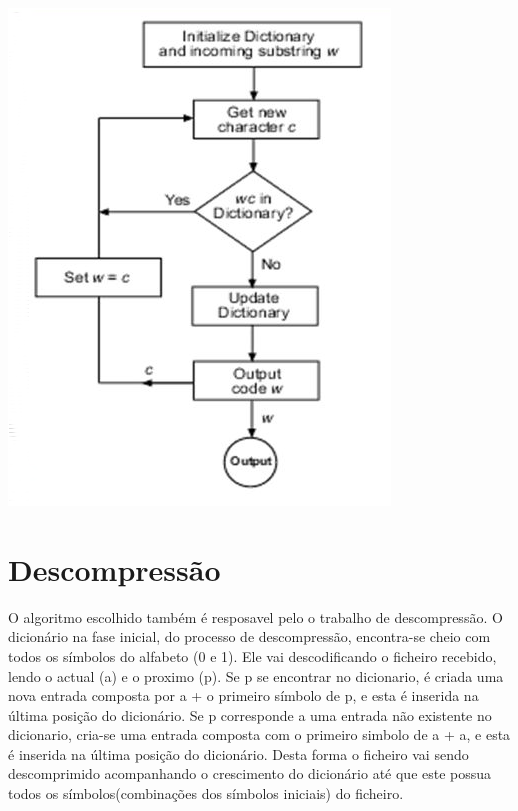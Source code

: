 \documentclass[12pt]{article}
\begin{document}
\begin{center}
\includegraphics[scale=0.7]{compressor.png}\\[2cm]
\end{center}

\newpage
{}

\printindex
\section{Descompressão}
O algoritmo escolhido também é resposavel pelo o trabalho de descompressão. O dicionário na fase inicial, do processo de descompressão, encontra-se cheio com todos os símbolos do alfabeto (0 e 1). Ele vai descodificando o ficheiro recebido, lendo o actual (a) e o proximo (p). Se p se encontrar no dicionario, é criada uma nova entrada composta por a + o primeiro símbolo de p, e esta é inserida na última posição do dicionário. Se p corresponde a uma entrada não existente no dicionario, cria-se uma entrada composta com o primeiro simbolo de a + a, e esta é inserida na última posição do dicionário. Desta forma o ficheiro vai sendo descomprimido acompanhando o crescimento do dicionário até que este possua todos os símbolos(combinações dos símbolos iniciais) do ficheiro.\\[0.5cm]
\end{document}
